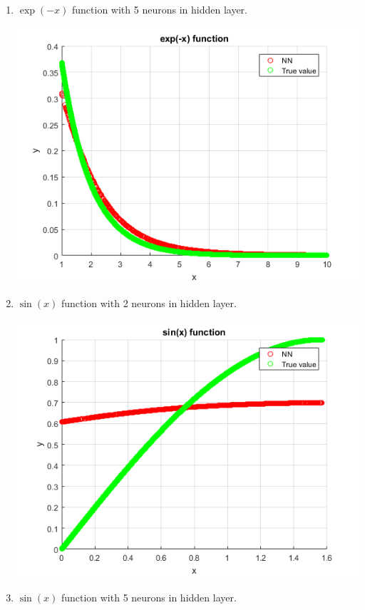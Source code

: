 \documentclass[a4paper, 12pt]{article}
\begin{document}
\begin{enumerate}
\item $\exp(-x)$ function with 5 neurons in hidden layer.

\includegraphics[scale = 0.8]{exp5.png}

\item $\sin(x)$ function with 2 neurons in hidden layer.

\includegraphics[scale = 0.8]{sin2.png}

\item $\sin(x)$ function with 5 neurons in hidden layer.


\end{enumerate}
\end{document}
